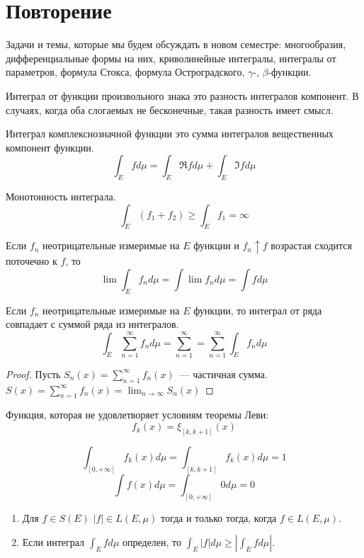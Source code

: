 \section{Повторение}
Задачи и темы, которые мы будем обсуждать в новом семестре: 
многообразия, дифференциальные формы на них, криволинейные интегралы, интегралы от параметров, формула Стокса, формула Остроградского, $\gamma$-, $\beta$-функции.

Интеграл от функции произвольного знака это разность интегралов компонент. 
В случаях, когда оба слогаемых не бесконечные, такая разность имеет смысл.

Интеграл комплекснозначной функции это сумма интегралов вещественных компонент функции.   
\[ 
    \int_E f d\mu = \int_E \Re f d\mu + \int_E \Im f d \mu 
\]


Монотонность интеграла.
\[ \int_E(f_1 + f_2) \geqslant \int_E f_1 = \infty  \]

\begin{theorem}
Если $f_n$ неотрицательные измеримые на $E$ функции и $f_n \uparrow f$ возрастая сходится поточечно к $f$, то 
\[ 
    \lim \int_E f_n d\mu = \int \lim f_n d\mu = \int f d\mu 
\]
\end{theorem}

\begin{theorem}
Если $f_n$ неотрицательные измеримые на $E$ функции, то интеграл от ряда совпадает с суммой ряда из интегралов.
\[ \int_E \sum_{n = 1}^\infty f_n d\mu = \sum_{n=1}^\infty = \sum_{n=1}^{\infty} \int_E f_n d\mu\]
\end{theorem}

\begin{proof}
    Пусть $S_n(x) = \sum_{n=1}^{\infty} f_n(x)$~--- частичная сумма.
    $S(x) = \sum_{n=1}^\infty f_n(x) = \lim_{n\to \infty} S_n(x)$ 
\end{proof}

\begin{example}
Функция, которая не удовлетворяет условиям теоремы Леви: 
\[ f_k(x) = \xi_{[k,k+1]}(x) \]

\[ \int_{[0, +\infty]} f_k(x)d\mu = \int_{[k,k+1]} f_k(x)d\mu = 1\]
\[ \int f(x) d\mu = \int_{[0, +\infty]} 0 d\mu = 0\]
\end{example}

\begin{remark}
\begin{enumerate}
\item Для $f\in S(E)$  $|f| \in L(E, \mu)$ тогда и только тогда, когда $f\in L(E, \mu)$.
\item Если интеграл $\int_E f d\mu$ определен, то $\int_E |f|d \mu \geqslant |\int_E f d\mu|$.  
\end{enumerate}
\end{remark}

